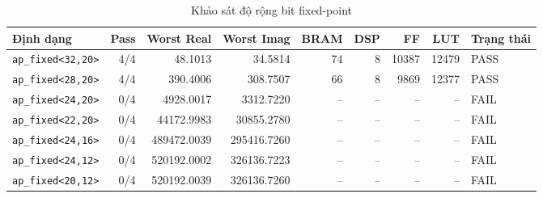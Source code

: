 ﻿\documentclass[conference]{IEEEtran}
\begin{document}
\begin{table}[t]
    \caption{Khảo sát độ rộng bit fixed-point}
    \centering
    \label{tab:bitwidth}
    \begin{tabular}{lrrrrrrrl}
        \toprule
        \textbf{Định dạng}        & \textbf{Pass} & \textbf{Worst Real} & \textbf{Worst Imag} & \textbf{BRAM} & \textbf{DSP} & \textbf{FF} & \textbf{LUT} & \textbf{Trạng thái} \\
        \midrule
        \texttt{ap\_fixed<32,20>} & 4/4           & 48.1013             & 34.5814             & 74            & 8            & 10387       & 12479        & PASS                \\
        \texttt{ap\_fixed<28,20>} & 4/4           & 390.4006            & 308.7507            & 66            & 8            & 9869        & 12377        & PASS                \\
        \texttt{ap\_fixed<24,20>} & 0/4           & 4928.0017           & 3312.7220           & --            & --           & --          & --           & FAIL                \\
        \texttt{ap\_fixed<22,20>} & 0/4           & 44172.9983          & 30855.2780          & --            & --           & --          & --           & FAIL                \\
        \texttt{ap\_fixed<24,16>} & 0/4           & 489472.0039         & 295416.7260         & --            & --           & --          & --           & FAIL                \\
        \texttt{ap\_fixed<24,12>} & 0/4           & 520192.0002         & 326136.7223         & --            & --           & --          & --           & FAIL                \\
        \texttt{ap\_fixed<20,12>} & 0/4           & 520192.0039         & 326136.7260         & --            & --           & --          & --           & FAIL                \\
        \bottomrule
    \end{tabular}
\end{table}
\end{document}
